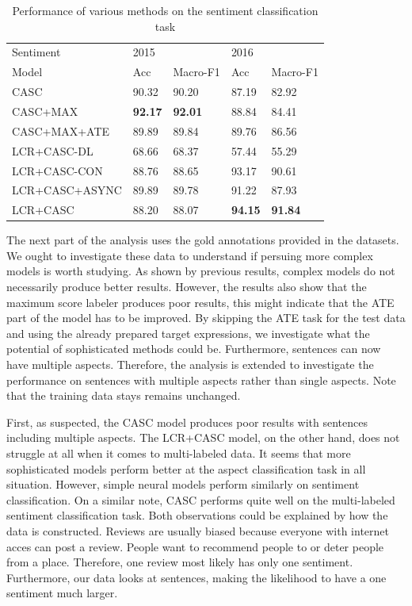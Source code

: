 \documentclass[american, oneside]{ecsgdp}
\begin{document}
\begin{table}[htbp]
\centering
\caption{Performance of various methods on the sentiment classification task}
\label{tab:sentiment-perf}
\begin{tabular}{@{\extracolsep{4pt}}lllll@{}}
\hline
Sentiment      & 2015           &                & 2016           &                \\ \cline{2-3} \cline{4-5}
Model          & Acc            & Macro-F1       & Acc            & Macro-F1       \\ \hline
CASC           & 90.32          & 90.20          & 87.19          & 82.92          \\
CASC+MAX       & \textbf{92.17} & \textbf{92.01} & 88.84          & 84.41          \\
CASC+MAX+ATE   & 89.89          & 89.84          & 89.76          & 86.56          \\
LCR+CASC-DL    & 68.66          & 68.37          & 57.44          & 55.29          \\
LCR+CASC-CON   & 88.76          & 88.65          & 93.17          & 90.61          \\
LCR+CASC+ASYNC & 89.89	        & 89.78	         & 91.22	      & 87.93          \\
LCR+CASC       & 88.20          & 88.07          & \textbf{94.15} & \textbf{91.84} \\ \hline
\end{tabular}%
\end{table}

The next part of the analysis uses the gold annotations provided in the datasets. We ought to investigate these data to understand if persuing more complex models is worth studying. As shown by previous results, complex models do not necessarily produce better results. However, the results also show that the maximum score labeler produces poor results, this might indicate that the ATE part of the model has to be improved. By skipping the ATE task for the test data and using the already prepared target expressions, we investigate what the potential of sophisticated methods could be. Furthermore, sentences can now have multiple aspects. Therefore, the analysis is extended to investigate the performance on sentences with multiple aspects rather than single aspects. Note that the training data stays remains unchanged.

First, as suspected, the CASC model produces poor results with sentences including multiple aspects. The LCR+CASC model, on the other hand, does not struggle at all when it comes to multi-labeled data. It seems that more sophisticated models perform better at the aspect classification task in all situation. However, simple neural models perform similarly on sentiment classification. On a similar note, CASC performs quite well on the multi-labeled sentiment classification task. Both observations could be explained by how the data is constructed. Reviews are usually biased because everyone with internet acces can post a review. People want to recommend people to or deter people from a place. Therefore, one review most likely has only one sentiment. Furthermore, our data looks at sentences, making the likelihood to have a one sentiment much larger.
\end{document}
